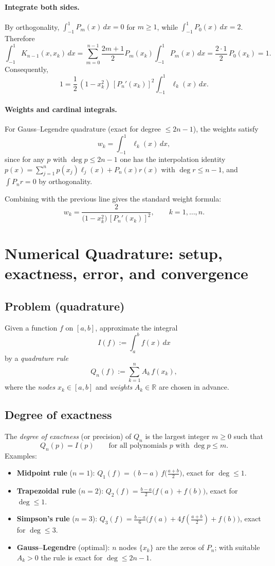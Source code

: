 \documentclass[12pt,a4paper]{article}
\theoremstyle{plain}
\theoremstyle{definition}
\theoremstyle{remark}
\theoremstyle{remark}
\begin{document}
\paragraph{Integrate both sides.}
By orthogonality, $\displaystyle\int_{-1}^{1}P_m(x)\,dx=0$ for $m\ge1$, while $\int_{-1}^{1}P_0(x)\,dx=2$.
Therefore
\[
\int_{-1}^{1}K_{n-1}(x,x_k)\,dx
=\sum_{m=0}^{n-1}\frac{2m+1}{2}P_m(x_k)\int_{-1}^{1}P_m(x)\,dx
=\frac{2\cdot1}{2}\,P_0(x_k)=1.
\]
Consequently,
\[
1=\frac{1}{2}\,(1-x_k^2)\,[P_n'(x_k)]^2\int_{-1}^{1}\ell_k(x)\,dx.
\]

\paragraph{Weights and cardinal integrals.}
For Gauss--Legendre quadrature (exact for degree $\le 2n-1$), the weights satisfy
\[
w_k=\int_{-1}^{1}\ell_k(x)\,dx,
\]
since for any $p$ with $\deg p\le 2n-1$ one has the interpolation identity
$p(x)=\sum_{j=1}^{n} p(x_j)\ell_j(x)+P_n(x)r(x)$ with $\deg r\le n-1$, and
$\int P_n r=0$ by orthogonality.

Combining with the previous line gives the standard weight formula:
\[
\boxed{\quad
	w_k=\frac{2}{\bigl(1-x_k^2\bigr)\,[P_n'(x_k)]^2},\qquad k=1,\dots,n.
	\quad}
\]

\section*{Numerical Quadrature: setup, exactness, error, and convergence}

\subsection*{Problem (quadrature)}
Given a function $f$ on $[a,b]$, approximate the integral
\[
I(f):=\int_a^b f(x)\,dx
\]
by a \emph{quadrature rule}
\[
Q_n(f):=\sum_{k=1}^{n} A_k\, f(x_k),
\]
where the \emph{nodes} $x_k\in[a,b]$ and \emph{weights} $A_k\in\mathbb{R}$ are chosen in advance.

\bigskip

\subsection*{Degree of exactness}
The \emph{degree of exactness} (or precision) of $Q_n$ is the largest integer $m\ge 0$ such that
\[
Q_n(p)=I(p)\qquad\text{for all polynomials $p$ with }\deg p\le m.
\]
Examples:
\begin{itemize}\setlength{\itemsep}{0.6em}
	\item \textbf{Midpoint rule} ($n=1$): $Q_1(f)=(b-a)\,f\!\big(\tfrac{a+b}{2}\big)$, exact for $\deg\le1$.
	\item \textbf{Trapezoidal rule} ($n=2$): $Q_2(f)=\tfrac{b-a}{2}\big(f(a)+f(b)\big)$, exact for $\deg\le1$.
	\item \textbf{Simpson’s rule} ($n=3$): $Q_3(f)=\tfrac{b-a}{6}\big(f(a)+4f(\tfrac{a+b}{2})+f(b)\big)$, exact for $\deg\le3$.
	\item \textbf{Gauss–Legendre} (optimal): $n$ nodes $\{x_k\}$ are the zeros of $P_n$; with suitable $A_k>0$ the rule is exact for $\deg\le 2n-1$.
\end{itemize}
\end{document}
